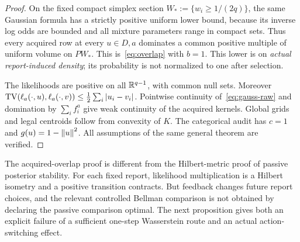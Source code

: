 \begin{proof}
On the fixed compact simplex section $W_*:=\{w_i\ge1/(2q)\}$, the same Gaussian formula has a strictly positive uniform lower bound, because its inverse log odds are bounded and all mixture parameters range in compact sets. Thus every acquired row at every $u\in D,a$ dominates a common positive multiple of uniform volume on $PW_*$. This is~\eqref{eq:overlap} with $b=1$. This lower is on \emph{actual report-induced density}; its probability is not normalized to one after selection.

The likelihoods are positive on all $\mathbb R^{q-1}$, with common null sets. Moreover
$\operatorname{TV}(\ell_a(\cdot,u),\ell_a(\cdot,v))\le\tfrac12\sum_i|u_i-v_i|$.
Pointwise continuity of~\eqref{eq:gauss-raw} and domination by $\sum_i f_i^a$ give weak continuity of the acquired kernels. Global grids and legal centroids follow from convexity of $K$. The categorical audit has $c=1$ and $g(u)=1-\left\lVert u\right\rVert^2$. All assumptions of the same general theorem are verified.
\end{proof}

The acquired-overlap proof is different from the Hilbert-metric proof of passive posterior stability. For each fixed report, likelihood multiplication is a Hilbert isometry and a positive transition contracts. But feedback changes future report choices, and the relevant controlled Bellman comparison is not obtained by declaring the passive comparison optimal. The next proposition gives both an explicit failure of a sufficient one-step Wasserstein route and an actual action-switching effect.

